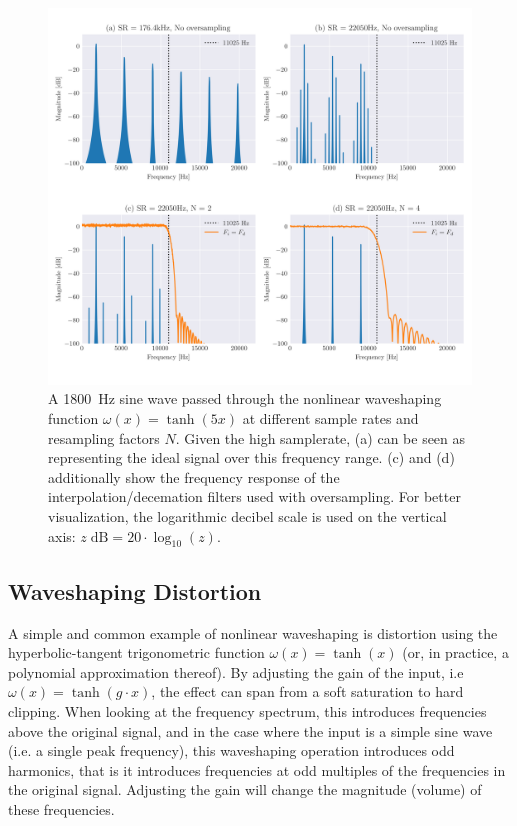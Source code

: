 \begin{figure}
  \centering
  \includegraphics[width=\textwidth]{Pictures/resampled_tanh.png}
  \caption{
    A \SI{1800}{Hz} sine wave passed through the nonlinear waveshaping function $\omega(x) = \tanh(5x)$ at
    different sample rates and resampling factors $N$. Given the high
    samplerate, (a) can be seen as representing the
    ideal signal over this frequency range. (c) and (d) additionally show the frequency response of the
    interpolation/decemation filters used with oversampling. For better visualization, the logarithmic decibel  scale is used on the vertical axis: $ z\; \mathrm{dB} = 20 \cdot \log_{10}(z) $.
  }
  \label{fig:resampled_tanh}
\end{figure}

\subsection{Waveshaping Distortion}

A simple and common example of nonlinear waveshaping is distortion using the hyperbolic-tangent trigonometric
function $\omega(x) = \tanh(x)$ (or, in practice, a polynomial approximation thereof). By adjusting the gain
of the input, i.e $\omega(x) = \tanh(g\cdot x)$, the effect can span from a soft saturation to hard clipping. When
looking at the frequency spectrum, this introduces frequencies above the original signal, and in the case
where the input is a simple sine wave (i.e. a single peak frequency), this waveshaping operation introduces
odd harmonics, that is it introduces frequencies at odd multiples of the frequencies in the original signal.
Adjusting the gain will change the magnitude (volume) of these frequencies.


